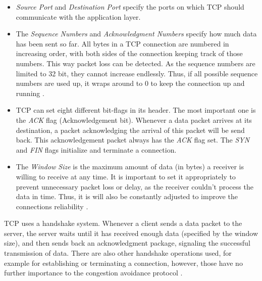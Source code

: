 \documentclass[a4paper,conference]{IEEEtran}
\begin{document}
\begin{itemize}
\item \textit{Source Port} and \textit{Destination Port} specify the ports on which TCP should communicate with the application layer.

\item The \textit{Sequence Numbers} and \textit{Acknowledgment Numbers} specify how much data has been sent so far. All bytes in a TCP connection are numbered in increasing order, with both sides of the connection keeping track of those numbers. This way packet loss can be detected. As the sequence numbers are limited to 32 bit, they cannot increase endlessly. Thus, if all possible sequence numbers are used up, it wraps around to 0 to keep the connection up and running \cite{postel1981transmission}.

\item TCP can set eight different bit-flags in its header. The most important one is the \textit{ACK} flag (Acknowledgement bit). Whenever a data packet arrives at its destination, a packet acknowledging the arrival of this packet will be send back. This acknowledgement packet always has the \textit{ACK} flag set. The \textit{SYN} and \textit{FIN} flags initialize and terminate a connection.

\item The \textit{Window Size} is the maximum amount of data (in bytes) a receiver is willing to receive at any time. It is important to set it appropriately to prevent unnecessary packet loss or delay, as the receiver couldn't process the data in time. Thus, it is will also be constantly adjusted to improve the connections reliability \cite{jacobson1992tcp}.
\end{itemize}
TCP uses a handshake system. Whenever a client sends a data packet to the server, the server waits until it has received enough data (specified by the window size), and then sends back an acknowledgment package, signaling the successful transmission of data. There are also other handshake operations used, for example for establishing or terminating a connection, however, those have no further importance to the congestion avoidance protocol \cite{1209197,jacobson1992tcp,huston2000tcp,jacobson1995congestion}.
\end{document}
